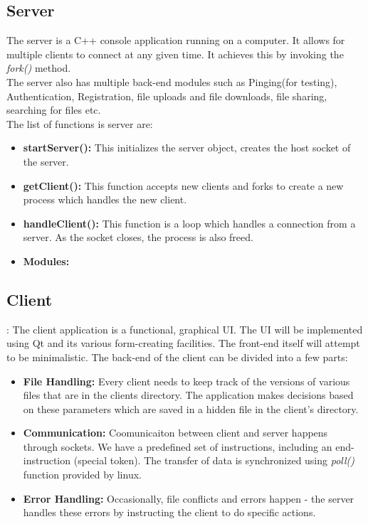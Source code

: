 \documentclass[]{article}
\begin{document}
\subsection{Server}
The server is a C++ console application running on a computer. It allows for multiple clients to connect at any given time. It achieves this by invoking the \textit{fork()} method. \\
The server also has multiple back-end modules such as Pinging(for testing), Authentication, Registration, file uploads and file downloads, file sharing, searching for files etc. \\
The list of functions is server are:
\begin{itemize}
\item \textbf{startServer():}  This initializes the server object, creates the host socket of the server. 
\item \textbf{getClient():}    This function accepts new clients and forks to create a new process which handles the new client.
\item \textbf{handleClient():} This function is a loop which handles a connection from a server. As the socket closes, the process is also freed.
\item \textbf{Modules:} %
\end{itemize}

\subsection{Client} :
The client application is a functional, graphical UI. The UI will be implemented using Qt and its various form-creating facilities. The front-end itself will attempt to be minimalistic.
The back-end of the client can be divided into a few parts:
\begin{itemize}
\item \textbf{File Handling:}
Every client needs to keep track of the versions of various files that are in the clients directory. The application makes decisions based on these parameters which are saved in a hidden file in the client's directory.
\item \textbf{Communication:}
Coomunicaiton between client and server happens through sockets. We have a predefined set of instructions, including an end-instruction (special token). The transfer of data is synchronized using \textit{poll()} function provided by linux.
\item \textbf{Error Handling:}
Occasionally, file conflicts and errors happen - the server handles these errors by instructing the client to do specific actions. 
\end{itemize}
\end{document}
